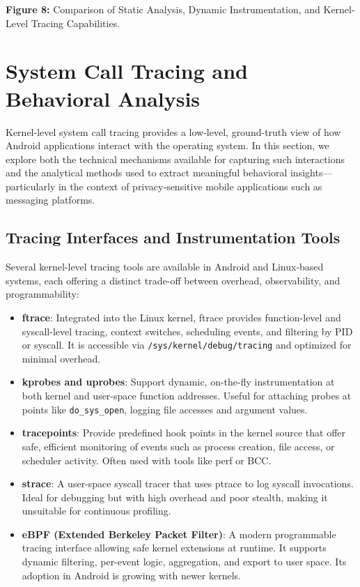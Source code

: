 \documentclass[a4paper,12pt]{report}
\begin{document}
\textbf{Figure 8:} Comparison of Static Analysis, Dynamic Instrumentation, and Kernel-Level Tracing Capabilities.

\section{System Call Tracing and Behavioral Analysis}

Kernel-level system call tracing provides a low-level, ground-truth view of how Android applications interact with the operating system. In this section, we explore both the technical mechanisms available for capturing such interactions and the analytical methods used to extract meaningful behavioral insights—particularly in the context of privacy-sensitive mobile applications such as messaging platforms.

\subsection{Tracing Interfaces and Instrumentation Tools}
Several kernel-level tracing tools are available in Android and Linux-based systems, each offering a distinct trade-off between overhead, observability, and programmability:

\begin{itemize}
\item \textbf{ftrace}: Integrated into the Linux kernel, ftrace provides function-level and syscall-level tracing, context switches, scheduling events, and filtering by PID or syscall. It is accessible via \texttt{/sys/kernel/debug/tracing} and optimized for minimal overhead.
\item \textbf{kprobes and uprobes}: Support dynamic, on-the-fly instrumentation at both kernel and user-space function addresses. Useful for attaching probes at points like \texttt{do\_sys\_open}, logging file accesses and argument values.
\item \textbf{tracepoints}: Provide predefined hook points in the kernel source that offer safe, efficient monitoring of events such as process creation, file access, or scheduler activity. Often used with tools like perf or BCC.
\item \textbf{strace}: A user-space syscall tracer that uses ptrace to log syscall invocations. Ideal for debugging but with high overhead and poor stealth, making it unsuitable for continuous profiling.
\item \textbf{eBPF (Extended Berkeley Packet Filter)}: A modern programmable tracing interface allowing safe kernel extensions at runtime. It supports dynamic filtering, per-event logic, aggregation, and export to user space. Its adoption in Android is growing with newer kernels.
\end{itemize}
\end{document}
